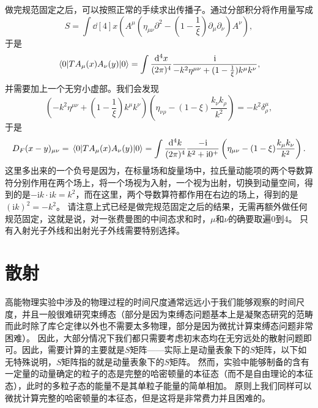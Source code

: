 \documentclass[hyperref, UTF8, a4paper]{ctexart}
\newcommand*{\ii}{\mathrm{i}}
\begin{document}
做完规范固定之后，可以按照正常的手续求出传播子。通过分部积分将作用量写成
\[
    S = \int \dd[4]{x} (A^\mu (\eta_{\mu \nu} \partial^2 - (1 - \frac{1}{\xi}) \partial_\mu \partial_\nu) A^\nu),
\]
于是
\[
    \mel{0}{T A_\mu(x) A_\nu(y)}{0} = \int \frac{\dd[4]{x}}{(2\pi)^4} \frac{\ii}{-k^2 \eta^{\mu \nu} + (1 - \frac{1}{\xi}) k^\mu k^\nu},
\]
并需要加上一个无穷小虚部。我们会发现
\[
    \left( -k^2 \eta^{\mu \nu} + (1 - \frac{1}{\xi}) k^\mu k^\nu \right) \left(\eta_{\nu \rho} - (1 - \xi) \frac{k_\nu k_\rho}{k^2} \right) = - k^2 \delta^\mu_\rho,
\]
于是
\begin{equation}
    D_F(x - y)_{\mu \nu} = \mel*{0}{T A_\mu(x) A_\nu(y)}{0} = \int \frac{\dd[4]{k}}{(2\pi)^4} \frac{-\ii}{k^2 + \ii 0^+} \left( \eta_{\mu \nu} - (1 - \xi) \frac{k_\mu k_\nu}{k^2} \right).
\end{equation}
这里多出来的一个负号是因为，在标量场和旋量场中，拉氏量动能项的两个导数算符分别作用在两个场上，将一个场视为入射，一个视为出射，切换到动量空间，得到的是$- \ii k \cdot \ii k = k^2$，而在这里，两个导数算符都作用在右边的场上，得到的是$(\ii k)^2=-k^2$。
请注意上式已经是做完规范固定之后的结果，无需再额外做任何规范固定，这就是说，对一张费曼图的中间态求和时，$\mu$和$\nu$的确要取遍$0$到$4$。
只有入射光子外线和出射光子外线需要特别选择。

\section{散射}

高能物理实验中涉及的物理过程的时间尺度通常远远小于我们能够观察的时间尺度，并且一般很难研究束缚态（部分是因为束缚态问题基本上是凝聚态研究的范畴而此时除了库仑定律以外也不需要太多物理，部分是因为微扰计算束缚态问题非常困难）。
因此，大部分情况下我们都只需要考虑初末态均在无穷远处的散射问题即可。因此，需要计算的主要就是$S$矩阵——实际上是动量表象下的$S$矩阵，以下如无特殊说明，$S$矩阵指的就是动量表象下的$S$矩阵。
然而，实验中能够制备的含有一定量的动量确定的粒子的态是完整的哈密顿量的本征态（而不是自由理论的本征态），此时的多粒子态的能量不是其单粒子能量的简单相加。
原则上我们同样可以微扰计算完整的哈密顿量的本征态，但是这将是非常费力并且困难的。
\end{document}
